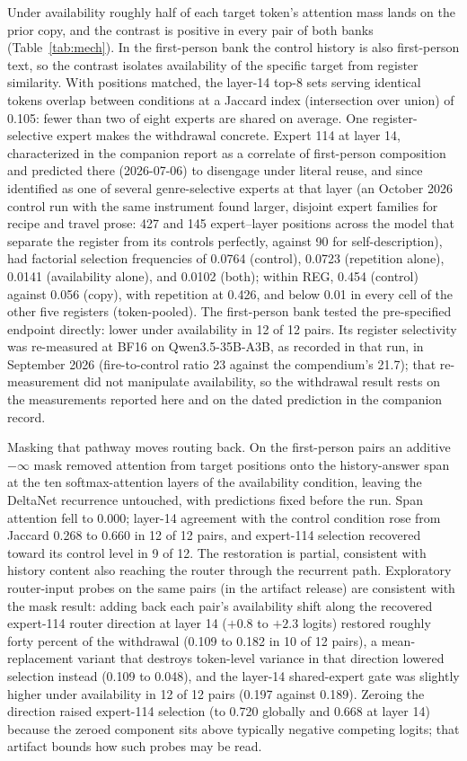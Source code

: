 \documentclass[10pt,a4paper,twocolumn]{article}
\begin{document}
Under availability roughly half of each target token's attention mass lands
on the prior copy, and the contrast is positive in every pair of both banks
(Table~\ref{tab:mech}). In the first-person bank the control history is also
first-person text, so the contrast isolates availability of the specific
target from register similarity. With positions matched, the layer-14 top-8
sets serving identical tokens overlap between conditions at a Jaccard index
(intersection over union) of 0.105: fewer than two of eight experts are
shared on average. One register-selective
expert makes the withdrawal concrete. Expert 114 at layer 14, characterized in
the companion report as a correlate of first-person composition
\cite{shorthill2026} and predicted there (2026-07-06) to disengage under
literal reuse, and since identified as one of several genre-selective
experts at that layer (an October 2026 control run with the same instrument
found larger, disjoint expert families for recipe and travel prose: 427 and
145 expert--layer positions across the model that separate the register
from its controls perfectly, against 90 for self-description), had factorial
selection frequencies of 0.0764 (control), 0.0723
(repetition alone), 0.0141 (availability alone), and 0.0102 (both); within
REG, 0.454 (control) against 0.056 (copy), with repetition at 0.426, and below
0.01 in every cell of the other five registers (token-pooled). The
first-person bank tested the pre-specified endpoint directly: lower under
availability in 12 of 12 pairs. Its register selectivity was re-measured at
BF16 on Qwen3.5-35B-A3B, as recorded in that run, in September 2026 (fire-to-control ratio 23 against
the compendium's 21.7); that re-measurement did not manipulate availability,
so the withdrawal result rests on the measurements reported here and on the
dated prediction in the companion record.

Masking that pathway moves routing back. On the first-person pairs an
additive \(-\infty\) mask removed attention from target positions onto the
history-answer span at the ten softmax-attention layers of the availability
condition, leaving the DeltaNet recurrence untouched, with predictions fixed
before the run. Span attention fell to 0.000; layer-14 agreement with the
control condition rose from Jaccard 0.268 to 0.660 in 12 of 12 pairs, and
expert-114 selection recovered toward its control level in 9 of 12. The
restoration is partial, consistent with history content also reaching the
router through the recurrent path. Exploratory router-input probes on the same
pairs (in the artifact release) are consistent with the mask result: adding
back each pair's availability shift along the recovered expert-114 router
direction at layer 14 (\(+0.8\) to \(+2.3\) logits) restored roughly forty
percent of the withdrawal (0.109 to 0.182 in 10 of 12 pairs), a
mean-replacement variant that destroys token-level variance in that direction
lowered selection instead (0.109 to 0.048), and the layer-14 shared-expert
gate was slightly higher under availability in 12 of 12 pairs (0.197 against
0.189). Zeroing the direction raised expert-114 selection (to 0.720 globally
and 0.668 at layer 14) because the zeroed component sits above typically
negative competing logits; that artifact bounds how such probes may be read.
\end{document}
